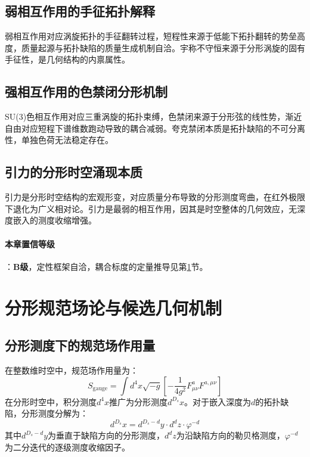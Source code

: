 \documentclass[12pt,a4paper,twocolumn]{article}
\renewcommand{\phi}{\varphi}
\begin{document}
\subsection{弱相互作用的手征拓扑解释}
弱相互作用对应涡旋拓扑的手征翻转过程，短程性来源于低能下拓扑翻转的势垒高度，质量起源与拓扑缺陷的质量生成机制自洽。宇称不守恒来源于分形涡旋的固有手征性，是几何结构的内禀属性。

\subsection{强相互作用的色禁闭分形机制}
\label{subsec:strong_force}
SU(3)色相互作用对应三重涡旋的拓扑束缚，色禁闭来源于分形弦的线性势，渐近自由对应短程下谱维数跑动导致的耦合减弱。夸克禁闭本质是拓扑缺陷的不可分离性，单独色荷无法稳定存在。

\subsection{引力的分形时空涌现本质}
引力是分形时空结构的宏观形变，对应质量分布导致的分形测度弯曲，在红外极限下退化为广义相对论。引力是最弱的相互作用，因其是时空整体的几何效应，无深度嵌入的测度收缩增强。

\paragraph{本章置信等级}：\textbf{B级}，定性框架自洽，耦合标度的定量推导见第\ref{sec:gauge_fractal}节。

\section{分形规范场论与候选几何机制}
\label{sec:gauge_fractal}

\subsection{分形测度下的规范场作用量}
\label{subsec:fractal_gauge_action}
在整数维时空中，规范场作用量为：
\[
S_{\text{gauge}} = \int d^4x \sqrt{-g} \left[ -\frac{1}{4g^2} F_{\mu\nu}^a F^{a,\mu\nu} \right]
\]
在分形时空中，积分测度$d^4x$推广为分形测度$d^{D_s}x$。对于嵌入深度为$d$的拓扑缺陷，分形测度分解为：
\begin{equation}
d^{D_s}x = d^{D_s-d}y \cdot d^d z \cdot \phi^{-d}
\label{eq:fractal_measure}
\end{equation}
其中$d^{D_s-d}y$为垂直于缺陷方向的分形测度，$d^d z$为沿缺陷方向的勒贝格测度，$\phi^{-d}$为二分迭代的逐级测度收缩因子。
\end{document}

